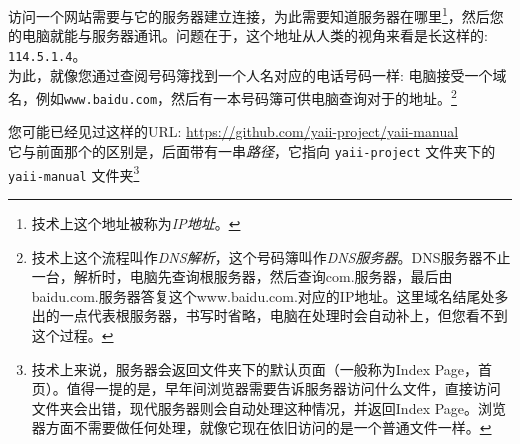 访问一个网站需要与它的服务器建立连接，为此需要知道服务器在哪里\footnote{技术上这个地址被称为\textit{IP地址}。}，然后您的电脑就能与服务器通讯。问题在于，这个地址从人类的视角来看是长这样的: \verb|114.5.1.4|。\\
为此，就像您通过查阅号码簿找到一个人名对应的电话号码一样: 电脑接受一个域名，例如\verb|www.baidu.com|，然后有一本号码簿可供电脑查询对于的地址。\footnote{技术上这个流程叫作\textit{DNS解析}，这个号码簿叫作\textit{DNS服务器}。DNS服务器不止一台，解析时，电脑先查询根服务器，然后查询com.服务器，最后由baidu.com.服务器答复这个www.baidu.com.对应的IP地址。这里域名结尾处多出的一点代表根服务器，书写时省略，电脑在处理时会自动补上，但您看不到这个过程。}

您可能已经见过这样的URL: \url{https://github.com/yaii-project/yaii-manual} \\
它与前面那个的区别是，后面带有一串\textit{路径}，它指向 \verb|yaii-project| 文件夹下的  \verb|yaii-manual| 文件夹\footnote{技术上来说，服务器会返回文件夹下的默认页面（一般称为Index Page，首页）。值得一提的是，早年间浏览器需要告诉服务器访问什么文件，直接访问文件夹会出错，现代服务器则会自动处理这种情况，并返回Index Page。浏览器方面不需要做任何处理，就像它现在依旧访问的是一个普通文件一样。}

\endinput
